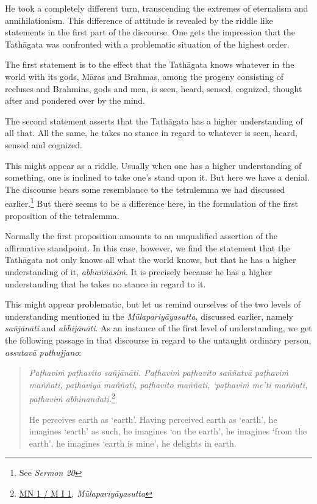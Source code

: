 He took a completely different turn, transcending the extremes of eternalism and annihilationism. This difference of attitude is revealed by the riddle like statements in the first part of the discourse. One gets the impression that the Tathāgata was confronted with a problematic situation of the highest order.

The first statement is to the effect that the Tathāgata knows whatever in the world with its gods, Māras and Brahmas, among the progeny consisting of recluses and Brahmins, gods and men, is seen, heard, sensed, cognized, thought after and pondered over by the mind.

The second statement asserts that the Tathāgata has a higher understanding of all that. All the same, he takes no stance in regard to whatever is seen, heard, sensed and cognized.

This might appear as a riddle. Usually when one has a higher understanding of something, one is inclined to take one's stand upon it. But here we have a denial. The discourse bears some resemblance to the tetralemma we had discussed earlier.\footnote{See \emph{Sermon 20}} But there seems to be a difference here, in the formulation of the first proposition of the tetralemma.

Normally the first proposition amounts to an unqualified assertion of the affirmative standpoint. In this case, however, we find the statement that the Tathāgata not only knows all what the world knows, but that he has a higher understanding of it, \emph{abhaññāsiṁ}. It is precisely because he has a higher understanding that he takes no stance in regard to it.

This might appear problematic, but let us remind ourselves of the two levels of understanding mentioned in the \emph{Mūlapariyāyasutta}, discussed earlier, namely \emph{sañjānāti} and \emph{abhijānāti}. As an instance of the first level of understanding, we get the following passage in that discourse in regard to the untaught ordinary person, \emph{assutavā puthujjano}:

\begin{quote}
\emph{Paṭhaviṁ paṭhavito sañjānāti. Paṭhaviṁ paṭhavito saññatvā paṭhaviṁ maññati, paṭhaviyā maññati, paṭhavito maññati, `paṭhaviṁ me'ti maññati, paṭhaviṁ abhinandati.}\footnote{\href{https://suttacentral.net/mn1/pli/ms}{MN 1 / M I 1}, \emph{Mūlapariyāyasutta}}

He perceives earth as `earth'. Having perceived earth as `earth', he imagines `earth' as such, he imagines `on the earth', he imagines `from the earth', he imagines `earth is mine', he delights in earth.
\end{quote}

